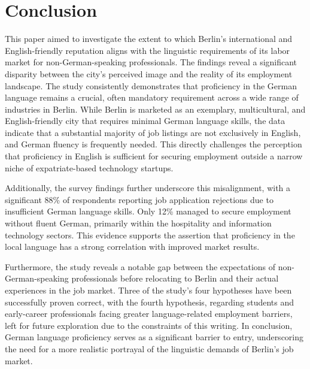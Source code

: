 \chapter{Conclusion}

This paper aimed to investigate the extent to which Berlin’s international and English-friendly reputation aligns with the linguistic requirements of its labor market for non-German-speaking professionals. The findings reveal a significant disparity between the city’s perceived image and the reality of its employment landscape. The study consistently demonstrates that proficiency in the German language remains a crucial, often mandatory requirement across a wide range of industries in Berlin. While Berlin is marketed as an exemplary, multicultural, and English-friendly city that requires minimal German language skills, the data indicate that a substantial majority of job listings are not exclusively in English, and German fluency is frequently needed. This directly challenges the perception that proficiency in English is sufficient for securing employment outside a narrow niche of expatriate-based technology startups. 

Additionally, the survey findings further underscore this misalignment, with a significant 88\% of respondents reporting job application rejections due to insufficient German language skills. Only 12\% managed to secure employment without fluent German, primarily within the hospitality and information technology sectors. This evidence supports the assertion that proficiency in the local language has a strong correlation with improved market results.

Furthermore, the study reveals a notable gap between the expectations of non-German-speaking professionals before relocating to Berlin and their actual experiences in the job market. Three of the study’s four hypotheses have been successfully proven correct, with the fourth hypothesis, regarding students and early-career professionals facing greater language-related employment barriers, left for future exploration due to the constraints of this writing. In conclusion, German language proficiency serves as a significant barrier to entry, underscoring the need for a more realistic portrayal of the linguistic demands of Berlin’s job market.
